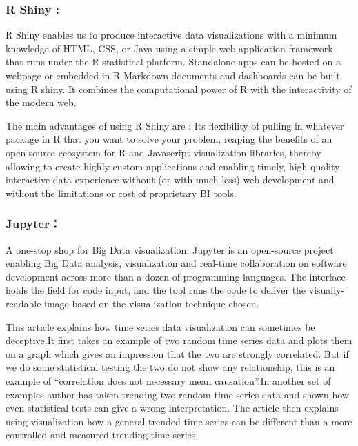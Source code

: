 \documentclass[]{book}
\theoremstyle{definition}
\theoremstyle{definition}
\theoremstyle{definition}
\theoremstyle{remark}
\begin{document}
\subsubsection{R Shiny :}\label{r-shiny}

R Shiny enables us to produce interactive data visualizations with a
minimum knowledge of HTML, CSS, or Java using a simple web application
framework that runs under the R statistical platform. Standalone apps
can be hosted on a webpage or embedded in R Markdown documents and
dashboards can be built using R shiny. It combines the computational
power of R with the interactivity of the modern web.

The main advantages of using R Shiny are : Its flexibility of pulling in
whatever package in R that you want to solve your problem, reaping the
benefits of an open source ecosystem for R and Javascript visualization
libraries, thereby allowing to create highly custom applications and
enabling timely, high quality interactive data experience without (or
with much less) web development and without the limitations or cost of
proprietary BI tools.

\citep{shiny_interactive_viz}

\subsubsection{Jupyter：}\label{jupyter}

A one-stop shop for Big Data visualization. Jupyter is an open-source
project enabling Big Data analysis, visualization and real-time
collaboration on software development across more than a dozen of
programming languages. The interface holds the field for code input, and
the tool runs the code to deliver the visually-readable image based on
the visualization technique chosen.

This article explains how time series data visualization can sometimes
be deceptive.It first takes an example of two random time series data
and plots them on a graph which gives an impression that the two are
strongly correlated. But if we do some statistical testing the two do
not show any relationship, this is an example of ``correlation does not
necessary mean causation''.In another set of examples author has taken
trending two random time series data and shown how even statistical
tests can give a wrong interpretation. The article then explains using
visualization how a general trended time series can be different than a
more controlled and measured trending time series.
\end{document}
